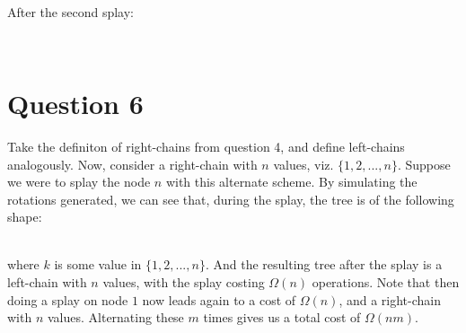 \documentclass[a4paper,11pt]{scrartcl}
\begin{document}
 \\
After the second splay: \\

 \\

\section*{Question 6}
Take the definiton of right-chains from question 4, and define left-chains analogously. Now, consider a right-chain with $n$ values, viz. $\{ 1, 2, ..., n \}$. Suppose we were to splay the node $n$ with this alternate scheme. By simulating the rotations generated, we can see that, during the splay, the tree is of the following shape: \\
 \\
where $k$ is some value in $\{ 1, 2, ..., n \}$. And the resulting tree after the splay is a left-chain with $n$ values, with the splay costing $\Omega(n)$ operations. Note that then doing a splay on node $1$ now leads again to a cost of $\Omega(n)$, and a right-chain with $n$ values. Alternating these $m$ times gives us a total cost of $\Omega(nm)$.
\end{document}
